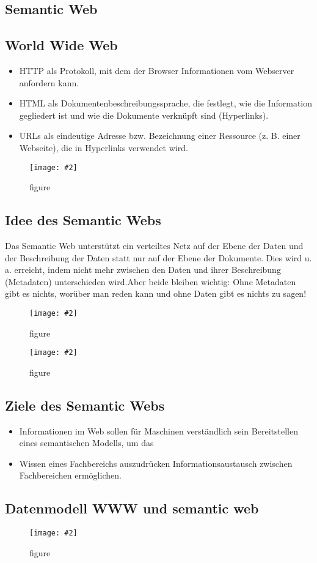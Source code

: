 \documentclass[a4paper,10pt,titlepage=false]{scrreprt}
\newcommand{\pic}[2][figure]{\begin{figure}[h]
 \centering
 \texttt{[image: \#2]}
 \caption{#1}
\end{figure}
}
\begin{document}
\begin{itemize}
\chapter{Semantic Web} %
\label{cha:semantic_web}
\section{World Wide Web} %
\label{sec:world_wide_web}
\begin{itemize}
  \item HTTP als Protokoll, mit dem der Browser
Informationen vom Webserver anfordern kann.
\item HTML als Dokumentenbeschreibungssprache, die
festlegt, wie die Information gegliedert ist und wie die
Dokumente verknüpft sind (Hyperlinks).
\item URLs als eindeutige Adresse bzw. Bezeichnung einer
Ressource (z. B. einer Webseite), die in Hyperlinks
verwendet wird.
\end{itemize}
\pic{sweb.png}

\section{Idee des Semantic Webs} %
\label{sec:idee_des_semantic_webs}
Das Semantic Web unterstützt ein verteiltes Netz auf der
Ebene der Daten und der Beschreibung der Daten statt nur
auf der Ebene der Dokumente.
Dies wird u. a. erreicht, indem nicht mehr zwischen den
Daten und ihrer Beschreibung (Metadaten) unterschieden
wird.Aber beide bleiben wichtig:
Ohne Metadaten gibt es nichts,
worüber man reden kann und
ohne Daten gibt es nichts zu sagen!

\pic{sweb2.png}
\pic{sweb3.png}

\section{Ziele des Semantic Webs} %
\label{sec:ziele_des_semantic_webs}
\begin{itemize}
  \item Informationen im Web sollen für Maschinen
verständlich sein
Bereitstellen eines semantischen Modells, um das
\item Wissen eines Fachbereichs auszudrücken
Informationsaustausch zwischen Fachbereichen
ermöglichen.
\end{itemize}
\section{Datenmodell WWW und semantic web} %
\label{sec:datenmodell_www}
\pic{dmweb.png}



\end{itemize}
\end{document}
